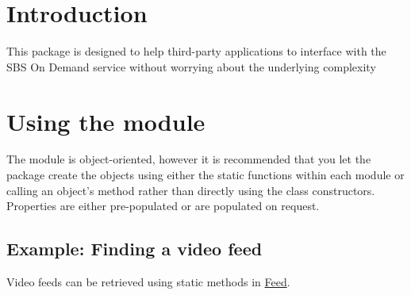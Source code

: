 \hypertarget{index_intro_sec}{}\section{\-Introduction}\label{index_intro_sec}
\-This package is designed to help third-\/party applications to interface with the \-S\-B\-S \-On \-Demand service without worrying about the underlying complexity\hypertarget{index_using_sec}{}\section{\-Using the module}\label{index_using_sec}
\-The module is object-\/oriented, however it is recommended that you let the package create the objects using either the static functions within each module or calling an object's method rather than directly using the class constructors. \-Properties are either pre-\/populated or are populated on request.\hypertarget{index_example_feed}{}\subsection{\-Example\-: Finding a video feed}\label{index_example_feed}
\-Video feeds can be retrieved using static methods in \hyperlink{namespace_sbs_on_demand_1_1_feed}{\-Feed}.

